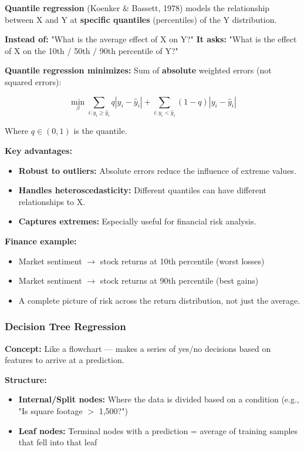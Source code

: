 \documentclass[12pt,openany]{book}
\begin{document}
\textbf{Quantile regression} (Koenker \& Bassett, 1978) models the relationship between X and Y at \textbf{specific quantiles} (percentiles) of the Y distribution.

\textbf{Instead of:} "What is the average effect of X on Y?"
\textbf{It asks:} "What is the effect of X on the 10th / 50th / 90th percentile of Y?"

\textbf{Quantile regression minimizes:} Sum of \textbf{absolute} weighted errors (not squared errors):

\[
\min_\beta \sum_{i: y_i \geq \hat{y}_i} q|y_i - \hat{y}_i| + \sum_{i: y_i < \hat{y}_i} (1-q)|y_i - \hat{y}_i|
\]


Where \(q \in (0,1)\) is the quantile.

\textbf{Key advantages:}
\begin{itemize}[leftmargin=*]
    \item \textbf{Robust to outliers:} Absolute errors reduce the influence of extreme values.
    \item \textbf{Handles heteroscedasticity:} Different quantiles can have different relationships to X.
    \item \textbf{Captures extremes:} Especially useful for financial risk analysis.

\end{itemize}

\textbf{Finance example:}
\begin{itemize}[leftmargin=*]
    \item Market sentiment \(\rightarrow\) stock returns at 10th percentile (worst losses)
    \item Market sentiment \(\rightarrow\) stock returns at 90th percentile (best gains)
    \item A complete picture of risk across the return distribution, not just the average.

\end{itemize}

\medskip


\subsubsection{Decision Tree Regression}


\textbf{Concept:} Like a flowchart --- makes a series of yes/no decisions based on features to arrive at a prediction.

\textbf{Structure:}
\begin{itemize}[leftmargin=*]
    \item \textbf{Internal/Split nodes:} Where the data is divided based on a condition (e.g., "Is square footage \(>\) 1,500?")
    \item \textbf{Leaf nodes:} Terminal nodes with a prediction = average of training samples that fell into that leaf

\end{itemize}
\end{document}
